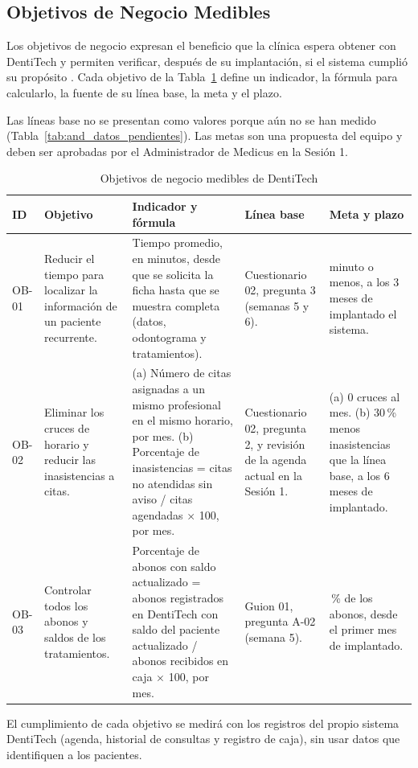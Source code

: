 \subsection{Objetivos de Negocio Medibles}

Los objetivos de negocio expresan el beneficio que la cl{\'i}nica espera obtener con DentiTech y permiten verificar, despu{\'e}s de su implantaci{\'o}n, si el sistema cumpli{\'o} su prop{\'o}sito \cite{wiegers2023}. Cada objetivo de la Tabla~\ref{tab:and_objetivos} define un indicador, la f{\'o}rmula para calcularlo, la fuente de su l{\'i}nea base, la meta y el plazo.

Las l{\'i}neas base no se presentan como valores porque a{\'u}n no se han medido (Tabla~\ref{tab:and_datos_pendientes}). Las metas son una propuesta del equipo y deben ser aprobadas por el Administrador de Medicus en la Sesi{\'o}n 1.

\begin{table}[htbp]
\centering
\caption{Objetivos de negocio medibles de DentiTech}
\label{tab:and_objetivos}
\small
\begin{tabularx}{\textwidth}{>{\raggedright\arraybackslash}p{0.9cm} >{\raggedright\arraybackslash}p{3.0cm} >{\raggedright\arraybackslash}X >{\raggedright\arraybackslash}p{2.6cm} >{\raggedright\arraybackslash}p{2.8cm}}
\toprule
\textbf{ID} & \textbf{Objetivo} & \textbf{Indicador y f{\'o}rmula} & \textbf{L{\'i}nea base} & \textbf{Meta y plazo} \\
\midrule
OB-01 & Reducir el tiempo para localizar la informaci{\'o}n de un paciente recurrente. & Tiempo promedio, en minutos, desde que se solicita la ficha hasta que se muestra completa (datos, odontograma y tratamientos). & Cuestionario 02, pregunta 3 (semanas 5 y 6). & 1 minuto o menos, a los 3 meses de implantado el sistema. \\
\addlinespace
OB-02 & Eliminar los cruces de horario y reducir las inasistencias a citas. & (a) N{\'u}mero de citas asignadas a un mismo profesional en el mismo horario, por mes. (b) Porcentaje de inasistencias = citas no atendidas sin aviso / citas agendadas $\times$ 100, por mes. & Cuestionario 02, pregunta 2, y revisi{\'o}n de la agenda actual en la Sesi{\'o}n 1. & (a) 0 cruces al mes. (b) 30\,\% menos inasistencias que la l{\'i}nea base, a los 6 meses de implantado. \\
\addlinespace
OB-03 & Controlar todos los abonos y saldos de los tratamientos. & Porcentaje de abonos con saldo actualizado = abonos registrados en DentiTech con saldo del paciente actualizado / abonos recibidos en caja $\times$ 100, por mes. & Guion 01, pregunta A-02 (semana 5). & 100\,\% de los abonos, desde el primer mes de implantado. \\
\bottomrule
\end{tabularx}
\end{table}

El cumplimiento de cada objetivo se medir{\'a} con los registros del propio sistema DentiTech (agenda, historial de consultas y registro de caja), sin usar datos que identifiquen a los pacientes.
